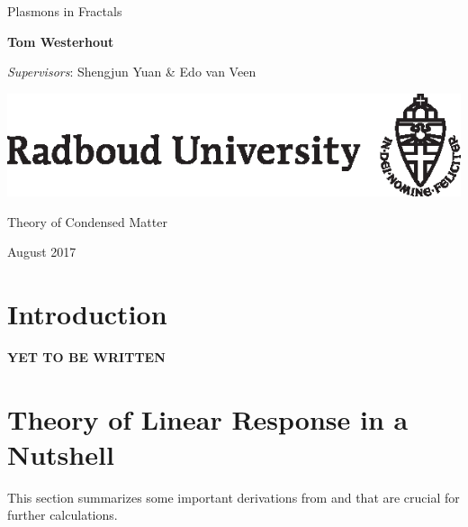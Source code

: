 \documentclass[a4paper,12pt]{article}
\begin{document}
\begin{titlepage}
    \begin{center}
        \vspace*{1cm}
   
        {\ttfamily\LARGE Plasmons in Fractals\par}
        
        \vspace{1.0cm}
        
        {\ttfamily\large\textbf{Tom Westerhout} \par}
        
        \vspace{0.5cm}

        {\ttfamily\textit{Supervisors}: Shengjun Yuan \& Edo van Veen}
        
        \vfill
        
        \vspace{0.8cm}
        
        \hbox{\hspace{5.6cm}\includegraphics{ru_e_a4_zwart_2014.eps}}
        
        {\ttfamily Theory of Condensed Matter \par}
        { August 2017}
        
    \end{center}
\end{titlepage}

\begin{center}
    
\end{center}

\tableofcontents

\newpage

\section{Introduction}
    \textbf{YET TO BE WRITTEN}

\newpage
\section{Theory of Linear Response in a Nutshell} \label{sec:linear_response}
    This section summarizes some important derivations from \cite{vonsovskiui1989quantum} and \cite{giuliani2005quantum} that are crucial for further calculations.
\end{document}
